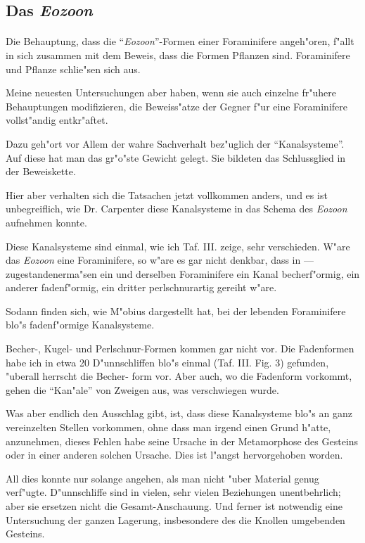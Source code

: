 \documentclass[a4paper, 11pt, oneside, german]{article}
\begin{document}
\subsection{Das \emph{Eozoon}}
\paragraph{}
Die Behauptung, dass die "`\emph{Eozoon}"'-Formen einer Foraminifere angeh"oren, f"allt in sich zusammen mit dem Beweis, dass die Formen Pflanzen sind. Foraminifere und Pflanze schlie"sen sich aus.

Meine neuesten Untersuchungen aber haben, wenn sie auch einzelne fr"uhere Behauptungen modifizieren, die Beweiss"atze der Gegner f"ur eine Foraminifere vollst"andig entkr"aftet.

Dazu geh"ort vor Allem der wahre Sachverhalt bez"uglich der "`Kanalsysteme"'. Auf diese hat man das gr"o"ste Gewicht gelegt. Sie bildeten das Schlussglied in der Beweiskette.

Hier aber verhalten sich die Tatsachen jetzt vollkommen anders, und es ist unbegreiflich, wie Dr. Carpenter diese Kanalsysteme in das Schema des \emph{Eozoon} aufnehmen konnte.

Diese Kanalsysteme sind einmal, wie ich Taf. III. zeige, sehr verschieden. W"are das \emph{Eozoon} eine Foraminifere, so w"are es gar nicht denkbar, dass in --- zugestandenerma"sen ein und derselben Foraminifere ein Kanal becherf"ormig, ein anderer fadenf"ormig, ein dritter perlschnurartig gereiht w"are.

Sodann finden sich, wie M"obius dargestellt hat, bei der lebenden Foraminifere blo"s fadenf"ormige Kanalsysteme.

Becher-, Kugel- und Perlschnur-Formen kommen gar nicht vor. Die Fadenformen habe ich in etwa 20 D"unnschliffen blo"s einmal (Taf. III. Fig. 3) gefunden, "uberall herrscht die Becher- form vor. Aber auch, wo die Fadenform vorkommt, gehen die "`Kan"ale"' von Zweigen aus, was verschwiegen wurde.

Was aber endlich den Ausschlag gibt, ist, dass diese Kanalsysteme blo"s an ganz vereinzelten Stellen vorkommen, ohne dass man irgend einen Grund h"atte, anzunehmen, dieses Fehlen habe seine Ursache in der Metamorphose des Gesteins oder in einer anderen solchen Ursache. Dies ist l"angst hervorgehoben worden.

All dies konnte nur solange angehen, als man nicht "uber Material genug verf"ugte. D"unnschliffe sind in vielen, sehr vielen Beziehungen unentbehrlich; aber sie ersetzen nicht die Gesamt-Anschauung. Und ferner ist notwendig eine Untersuchung der ganzen Lagerung, insbesondere des die Knollen umgebenden Gesteins.
\end{document}
